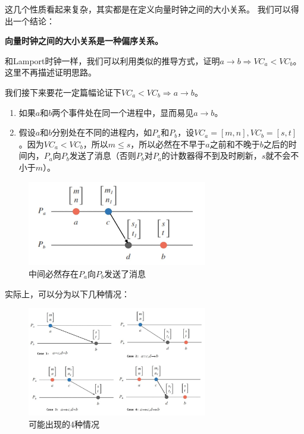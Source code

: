 \documentclass[cn,11pt,chinese]{elegantbook}
\begin{document}
这几个性质看起来复杂，其实都是在定义向量时钟之间的大小关系。 我们可以得出一个结论：

\textbf{向量时钟之间的大小关系是一种偏序关系。}

和Lamport时钟一样，我们可以利用类似的推导方式，证明$a \rightarrow b \Rightarrow VC_a < VC_b$。这里不再描述证明思路。

我们接下来要花一定篇幅论证下$VC_a < VC_b \Rightarrow a \rightarrow b$。

\begin{enumerate}
    \item 如果$a$和$b$两个事件处在同一个进程中，显而易见$a \rightarrow b$。
    \item 假设$a$和$b$分别处在不同的进程内，如$P_a$和$P_b$，设$VC_a = [m,n], VC_b = [s,t]$。因为$VC_a < VC_b$，所以$m≤s$，所以必然在不早于$a$之前和不晚于$b$之后的时间内，$P_a$向$P_b$发送了消息（否则$P_b$对$P_a$的计数器得不到及时刷新，$s$就不会不小于$m$）。
\end{enumerate}

\begin{figure}
    \centering
    \includegraphics[width=0.7\textwidth]{images/appendix-a-14.jpeg}
    \caption{中间必然存在$P_a$向$P_b$发送了消息}
\end{figure}

实际上，可以分为以下几种情况：

\begin{figure}
    \centering
    \includegraphics[width=0.7\textwidth]{images/appendix-a-15.jpeg}
    \caption{可能出现的4种情况}
\end{figure}
\end{document}
